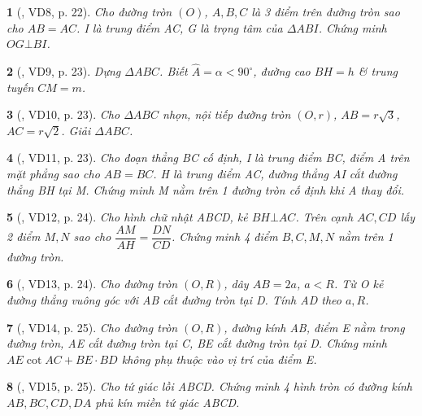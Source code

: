 \documentclass{article}
\newtheorem{baitoan}{}
\begin{document}
\begin{baitoan}[\cite{TLCT_THCS_Toan_9_hinh_hoc}, VD8, p. 22]
	Cho đường tròn $(O)$, $A,B,C$ là 3 điểm trên đường tròn sao cho $AB = AC$. I là trung điểm AC, G là trọng tâm của $\Delta ABI$. Chứng minh $OG\bot BI$.
\end{baitoan}

\begin{baitoan}[\cite{TLCT_THCS_Toan_9_hinh_hoc}, VD9, p. 23]
	Dựng $\Delta ABC$. Biết $\widehat{A} = \alpha < 90^\circ$, đường cao $BH = h$ \& trung tuyến $CM = m$.
\end{baitoan}

\begin{baitoan}[\cite{TLCT_THCS_Toan_9_hinh_hoc}, VD10, p. 23]
	Cho $\Delta ABC$ nhọn, nội tiếp đường tròn $(O,r)$, $AB = r\sqrt{3}$, $AC = r\sqrt{2}$. Giải $\Delta ABC$.
\end{baitoan}

\begin{baitoan}[\cite{TLCT_THCS_Toan_9_hinh_hoc}, VD11, p. 23]
	Cho đoạn thẳng BC cố định, I là trung điểm BC, điểm A trên mặt phẳng sao cho $AB = BC$. H là trung điểm AC, đường thẳng AI cắt đường thẳng BH tại M. Chứng minh M nằm trên 1 đường tròn cố định khi A thay đổi.
\end{baitoan}

\begin{baitoan}[\cite{TLCT_THCS_Toan_9_hinh_hoc}, VD12, p. 24]
	Cho hình chữ nhật ABCD, kẻ $BH\bot AC$. Trên cạnh $AC,CD$ lấy 2 điểm $M,N$ sao cho $\dfrac{AM}{AH} = \dfrac{DN}{CD}$. Chứng minh 4 điểm $B,C,M,N$ nằm trên 1 đường tròn.
\end{baitoan}

\begin{baitoan}[\cite{TLCT_THCS_Toan_9_hinh_hoc}, VD13, p. 24]
	Cho đường tròn $(O,R)$, dây $AB = 2a$, $a < R$. Từ O kẻ đường thẳng vuông góc với AB cắt đường tròn tại D. Tính AD theo $a,R$.
\end{baitoan}

\begin{baitoan}[\cite{TLCT_THCS_Toan_9_hinh_hoc}, VD14, p. 25]
	Cho đường tròn $(O,R)$, đường kính AB, điểm E nằm trong đường tròn, AE cắt đường tròn tại C, BE cắt đường tròn tại D. Chứng minh $AE\cot AC + BE\cdot BD$ không phụ thuộc vào vị trí của điểm E.
\end{baitoan}

\begin{baitoan}[\cite{TLCT_THCS_Toan_9_hinh_hoc}, VD15, p. 25]
	Cho tứ giác lồi ABCD. Chứng minh 4 hình tròn có đường kính $AB,BC,CD,DA$ phủ kín miền tứ giác ABCD.
\end{baitoan}
\end{document}
